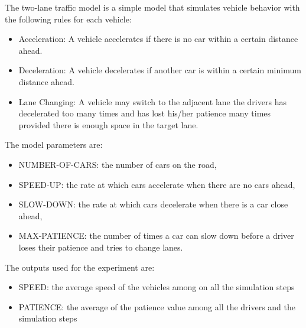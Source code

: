 \documentclass[10pt,letterpaper]{article}
\theoremstyle{definition}
\theoremstyle{remark}
\begin{document}
The two-lane traffic model is a simple model that simulates vehicle behavior with the following rules for each vehicle:
\begin{itemize}
    \item Acceleration: A vehicle accelerates if there is no car within a certain distance ahead.
    \item Deceleration: A vehicle decelerates if another car is within a certain minimum distance ahead.
    \item Lane Changing: A vehicle may switch to the adjacent lane the drivers has decelerated too many times and has lost his/her patience many times provided there is enough space in the target lane.
\end{itemize}
    
The model parameters are:
\begin{itemize}
    \item NUMBER-OF-CARS: the number of cars on the road,
    \item SPEED-UP: the rate at which cars accelerate when there are no cars ahead,
    \item SLOW-DOWN: the rate at which cars decelerate when there is a car close ahead,
    \item MAX-PATIENCE: the number of times a car can slow down before a driver loses their patience and tries to change lanes.
\end{itemize}


The outputs used for the experiment are:
\begin{itemize}
    \item SPEED: the average speed of the vehicles among on all the simulation steps
    \item PATIENCE: the average of the patience value among all the drivers and the simulation steps
\end{itemize}
\end{document}
